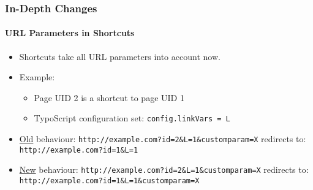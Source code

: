 \begin{frame}[fragile]
	\frametitle{In-Depth Changes}
	\framesubtitle{URL Parameters in Shortcuts}

	\begin{itemize}
		\item Shortcuts take all URL parameters into account now.
		\item Example:

			\begin{itemize}
				\item Page UID 2 is a shortcut to page UID 1
				\item TypoScript configuration set: \texttt{config.linkVars = L}
			\end{itemize}

		\item \underline{Old} behaviour:\newline
			\smaller
				\tabto{0.5cm}\texttt{http://example.com?id=2\&L=1\&customparam=X}\newline
				redirects to:\newline
				\tabto{0.5cm}\texttt{http://example.com?id=1\&L=1}
			\normalsize

		\item \underline{New} behaviour:\newline
			\smaller
				\tabto{0.5cm}\texttt{http://example.com?id=2\&L=1\&customparam=X}\newline
				redirects to:\newline
				\tabto{0.5cm}\texttt{http://example.com?id=1\&L=1\&customparam=X}
			\normalsize

	\end{itemize}

\end{frame}


